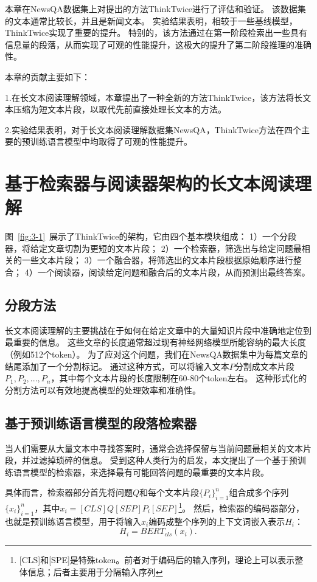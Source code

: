 本章在NewsQA数据集\cite{trischler2016newsqa}上对提出的方法ThinkTwice进行了评估和验证。
该数据集的文本通常比较长，并且是新闻文本。
实验结果表明，相较于一些基线模型\cite{devlin2018bert,joshi2020spanbert,tay2018densely}，ThinkTwice实现了重要的提升。
特别的，该方法通过在第一阶段检索出一些具有信息量的段落，从而实现了可观的性能提升，这极大的提升了第二阶段推理的准确性。

本章的贡献主要如下：

1.在长文本阅读理解领域，本章提出了一种全新的方法ThinkTwice，该方法将长文本压缩为短文本片段，以取代先前直接处理长文本的方法。

2.实验结果表明，对于长文本阅读理解数据集NewsQA\cite{trischler2016newsqa}，ThinkTwice方法在四个主要的预训练语言模型\cite{devlin2018bert,liu2019roberta,lan2019albert,joshi2020spanbert}中均取得了可观的性能提升。


\section{基于检索器与阅读器架构的长文本阅读理解}
图~\ref{fig:3-1}~展示了ThinkTwice的架构，它由四个基本模块组成：
1）一个分段器，将给定文章切割为更短的文本片段；
2）一个检索器，筛选出与给定问题最相关的一些文本片段；
3）一个融合器，将筛选出的文本片段根据原始顺序进行整合；
4）一个阅读器，阅读给定问题和融合后的文本片段，从而预测出最终答案。



\subsection{分段方法}
长文本阅读理解的主要挑战在于如何在给定文章中的大量知识片段中准确地定位到最重要的信息。
这些文章的长度通常超过现有神经网络模型所能容纳的最大长度（例如512个token）。
为了应对这个问题，我们在NewsQA数据集中为每篇文章的结尾添加了一个分割标记。
通过这种方式，可以将输入文本$P$分割成文本片段$P_1,P_2,...,P_n$，其中每个文本片段的长度限制在60-80个token左右。
这种形式化的分割方法可以有效地提高模型的处理效率和准确性。

\subsection{基于预训练语言模型的段落检索器}
当人们需要从大量文本中寻找答案时，通常会选择保留与当前问题最相关的文本片段，并过滤掉琐碎的信息。
受到这种人类行为的启发，本文提出了一个基于预训练语言模型的检索器，来选择最有可能回答问题的最重要的文本片段。

具体而言，检索器部分首先将问题$Q$和每个文本片段$\{P_i\}^n_{i=1}$组合成多个序列$\{x_i\}^n_{i=1}$，其中$x_i=[CLS]Q[SEP]P_i[SEP]$\footnote{[CLS]和[SPE]是特殊token。前者对于编码后的输入序列，理论上可以表示整体信息；后者主要用于分隔输入序列}。
然后，检索器的编码器部分，也就是预训练语言模型，用于将输入$x_i$编码成整个序列的上下文词嵌入表示$H_i$：
\begin{equation}
    H_i = BERT_{cls}(x_i).
\end{equation}

